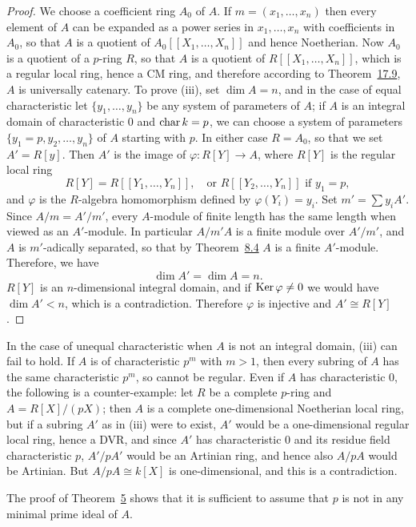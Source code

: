 \begin{proof}
We choose a coefficient ring $A_0$ of $A$. If $m = (x_1, \ldots, x_n)$ then every element
of $A$ can be expanded as a power series in $x_1, \ldots, x_n$ with coefficients in
$A_0$, so that $A$ is a quotient of $A_0[[X_1, \ldots, X_n]]$ and hence Noetherian. Now
$A_0$ is a quotient of a $p$-ring $R$, so that $A$ is a quotient of
$R[[X_1, \ldots, X_n]]$, which is a regular local ring, hence a CM ring, and therefore
according to Theorem~\hyperref[thm:17.9]{17.9}, $A$ is universally catenary. To prove (iii), set
$\dim A = n$, and in the case of equal characteristic let $\{y_1, \ldots, y_n\}$ be any
system of parameters of $A$; if $A$ is an integral domain of characteristic $0$ and
$\operatorname{char} k = p$, we can choose a system of parameters $\{y_1 = p, y_2, \ldots, y_n\}$ of $A$
starting with $p$. In either case $R = A_0$, so that we set $A' = R[y]$. Then $A'$ is the
image of $\varphi\colon R[Y] \to A$, where $R[Y]$ is the regular local ring
\[
  R[Y] = R[[Y_1, \ldots, Y_n]], \quad \text{or } R[[Y_2, \ldots, Y_n]] \text{ if } y_1 = p,
\]
and $\varphi$ is the $R$-algebra homomorphism defined by $\varphi(Y_i) = y_i$. Set
$m' = \sum y_iA'$. Since $A/m = A'/m'$, every $A$-module of finite length has the same
length when viewed as an $A'$-module. In particular $A/m'A$ is a finite module over
$A'/m'$, and $A$ is $m'$-adically separated, so that by Theorem~\hyperref[thm:8.4]{8.4} $A$ is a finite
$A'$-module. Therefore, we have
\[
  \dim A' = \dim A = n.
\]
$R[Y]$ is an $n$-dimensional integral domain, and if $\operatorname{Ker} \varphi \ne 0$ we would have
$\dim A' < n$, which is a contradiction. Therefore $\varphi$ is injective and
$A' \cong R[Y]$.
\end{proof}

\begin{remark}
In the case of unequal characteristic when $A$ is not an integral domain, (iii)
can fail to hold. If $A$ is of characteristic $p^m$ with $m > 1$, then every subring
of $A$ has the same characteristic $p^m$, so cannot be regular. Even if $A$ has
characteristic $0$, the following is a counter-example: let $R$ be a complete
$p$-ring and $A = R[X]/(pX)$; then $A$ is a complete one-dimensional Noetherian
local ring, but if a subring $A'$ as in (iii) were to exist, $A'$ would be a
one-dimensional regular local ring, hence a DVR, and since $A'$ has characteristic
$0$ and its residue field characteristic $p$, $A'/pA'$ would be an Artinian ring,
and hence also $A/pA$ would be Artinian. But $A/pA \cong k[X]$ is
one-dimensional, and this is a contradiction.

The proof of Theorem~\hyperref[thm:29.5]{5} shows that it is sufficient to assume that $p$ is not
in any minimal prime ideal of $A$.
\end{remark}

